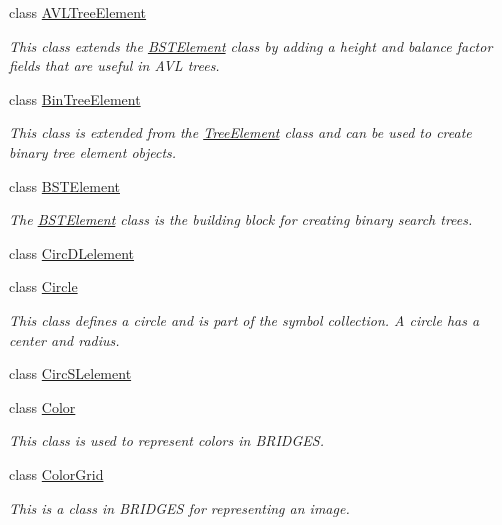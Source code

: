 \begin{DoxyCompactItemize}
class \hyperlink{classbridges_1_1base_1_1_a_v_l_tree_element}{A\+V\+L\+Tree\+Element}
\begin{DoxyCompactList}\small\item\em This class extends the \hyperlink{classbridges_1_1base_1_1_b_s_t_element}{B\+S\+T\+Element} class by adding a height and balance factor fields that are useful in A\+VL trees. \end{DoxyCompactList}\item 
class \hyperlink{classbridges_1_1base_1_1_bin_tree_element}{Bin\+Tree\+Element}
\begin{DoxyCompactList}\small\item\em This class is extended from the \hyperlink{classbridges_1_1base_1_1_tree_element}{Tree\+Element} class and can be used to create binary tree element objects. \end{DoxyCompactList}\item 
class \hyperlink{classbridges_1_1base_1_1_b_s_t_element}{B\+S\+T\+Element}
\begin{DoxyCompactList}\small\item\em The \hyperlink{classbridges_1_1base_1_1_b_s_t_element}{B\+S\+T\+Element} class is the building block for creating binary search trees. \end{DoxyCompactList}\item 
class \hyperlink{classbridges_1_1base_1_1_circ_d_lelement}{Circ\+D\+Lelement}
\item 
class \hyperlink{classbridges_1_1base_1_1_circle}{Circle}
\begin{DoxyCompactList}\small\item\em This class defines a circle and is part of the symbol collection. A circle has a center and radius. \end{DoxyCompactList}\item 
class \hyperlink{classbridges_1_1base_1_1_circ_s_lelement}{Circ\+S\+Lelement}
\item 
class \hyperlink{classbridges_1_1base_1_1_color}{Color}
\begin{DoxyCompactList}\small\item\em This class is used to represent colors in B\+R\+I\+D\+G\+ES. \end{DoxyCompactList}\item 
class \hyperlink{classbridges_1_1base_1_1_color_grid}{Color\+Grid}
\begin{DoxyCompactList}\small\item\em This is a class in B\+R\+I\+D\+G\+ES for representing an image. \end{DoxyCompactList}\item 

\end{DoxyCompactItemize}
